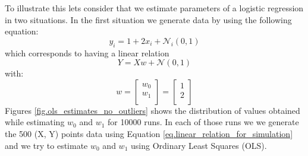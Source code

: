 To illustrate this lets consider that we estimate parameters of a logistic regression in two situations. In the first situation we generate data by using the following equation:
\begin{equation}
y_i = 1 + 2 x_i + \mathcal{N}_i(0,1)
\end{equation}
which corresponds to having a linear relation 
\begin{equation}
Y = Xw + \mathcal{N}(0,1)
\label{eq.linear_relation_for_simulation}
\end{equation}
with:
\begin{equation}
w = 
\begin{bmatrix}
w_0\\
w_1\\
\end{bmatrix}
= 
\begin{bmatrix}
1\\
2\\
\end{bmatrix}
\end{equation}
Figures \ref{fig.ols_estimates_no_outliers} shows the distribution of values obtained while estimating $w_0$ and $w_1$ for 10000 runs. In each of those runs we we generate the 500 (X, Y) points data using Equation \ref{eq.linear_relation_for_simulation} and we try to estimate $w_0$ and $w_1$ using Ordinary Least Squares (OLS).

